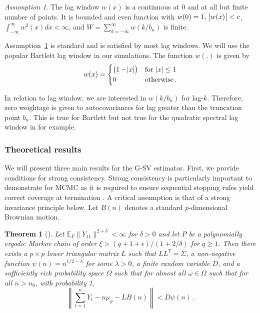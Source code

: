 \documentclass[11pt]{article}
\newcommand{\E}{\mathbb{E}}
\newtheorem{theorem}{Theorem}
\theoremstyle{remark}
\newtheorem{ass}{Assumption}
\begin{document}
\begin{ass}
\label{ass:lag_window}
The lag window $w(x)$ is a continuous at $0$ and at all but finite number of points. It is bounded and even function with $w(0)=1, \; \abs{w(x)} < c$, \; $\int_{-\infty}^{\infty}w^2(x)dx < \infty$, and $W = \sum_{k = -\infty}^{\infty} w(k/b_n)$ is finite.
\end{ass}
Assumption~\ref{ass:lag_window} is standard \citep[see]{ande:1971} and is satisfied by most lag windows. We will use the popular Bartlett lag window in our simulations. The function $w(.)$ is given by
\[
w(x) = \begin{cases}
\left(1 - \abs{x}\right) & \textrm{for } \abs{x} \leq 1 \\
0 & \textrm{otherwise}\,.
\end{cases}
\]

In relation to lag window, we are interested in $w(k/b_n)$ for lag-$k$. Therefore, zero weightage is given to autocovariances for lag greater than the truncation point $b_n$. This is true for Bartlett but not true for the quadratic spectral lag window in \cite{andr:1991} for example.

\subsubsection{Theoretical results} \label{sec:G-SVE}

We will present three main results for the G-SV estimator. First, we provide conditions for strong consistency. Strong consistency is particularly important to demonstrate for MCMC as it is required to ensure sequential stopping rules yield correct coverage at termination \citep{glyn:whit:1992}. A critical assumption is that of a strong invariance principle below. Let $B(n)$ denotes a standard $p$-dimensional Brownian motion.


\begin{theorem}[\cite{kuel:1976,vats:fleg:jon:2018}]
  \label{thm:kuelbs}
Let $\E_F\|Y_{11}\|^{2+ \delta} < \infty$ for $\delta > 0$ and let $P$ be a polynomially ergodic Markov chain of order $\xi > (q + 1 + \epsilon)/(1 + 2/\delta)$ for $q \geq 1$. Then there exists a $p \times p$ lower triangular matrix $L$ such that $LL^T = \Sigma$, a non-negative function $\psi(n) = n^{1/2 - \lambda}$ for some $\lambda > 0$, a finite random variable $D$, and a sufficiently rich probability space $\Omega$ such that for almost all $\omega \in \Omega$ such that for all $n > n_0$, with probability 1,
\[
\left\|\sum_{t=1}^{n}Y_t - n\mu_g - LB(n)\right\| < D\psi(n)\,.
\]
\end{theorem}
\end{document}
